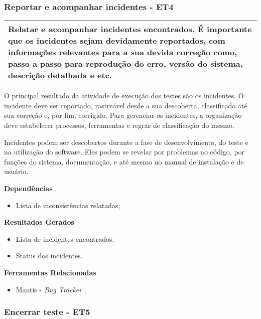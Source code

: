 \subsubsection{Reportar e acompanhar incidentes - ET4}
\label{sec:et4}

\begin{table}[!ht]
\centering
\begin{tabular}{|p{130mm}|}
\hline
Relatar e acompanhar incidentes encontrados. É importante que os incidentes sejam devidamente reportados, com informações relevantes para a sua devida correção como, passo a passo para reprodução do erro, versão do sistema, descrição detalhada e etc. \\ 
\hline
\end{tabular}
\end{table}

O principal resultado da atividade de execução dos testes são os incidentes. O incidente deve ser reportado, rastreável desde a sua descoberta, classificado até sua correção e, por fim, corrigido. Para gerenciar os incidentes, a organização deve estabelecer processos, ferramentas e regras de classificação do mesmo.

Incidentes podem ser descobertos durante a fase de desenvolvimento, do teste e na utilização do software. Eles podem se revelar por problemas no código, por funções do sistema, documentação, e até mesmo no manual de instalação e de usuário.

\textbf{Dependências}
\begin{itemize}
    \item Lista de inconsistências relatadas;
\end{itemize}

\textbf{Resultados Gerados}
\begin{itemize}
    \item Lista de incidentes encontrados.
    \item Status dos incidentes.
\end{itemize}

\textbf{Ferramentas Relacionadas}
\begin{itemize}
    \item Mantis - \textit{Bug Tracker} \cite{Mantis}.
\end{itemize}


\subsubsection{Encerrar teste - ET5}
\label{sec:et5}

